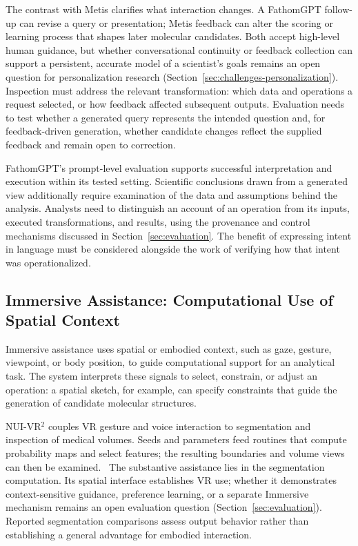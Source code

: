 The contrast with Metis clarifies what interaction changes. A FathomGPT follow-up can revise a query or presentation; Metis feedback can alter the scoring or learning process that shapes later molecular candidates. Both accept high-level human guidance, but whether conversational continuity or feedback collection can support a persistent, accurate model of a scientist's goals remains an open question for personalization research (Section~\ref{sec:challenges-personalization}). Inspection must address the relevant transformation: which data and operations a request selected, or how feedback affected subsequent outputs. Evaluation needs to test whether a generated query represents the intended question and, for feedback-driven generation, whether candidate changes reflect the supplied feedback and remain open to correction.

FathomGPT's prompt-level evaluation supports successful interpretation and execution within its tested setting. Scientific conclusions drawn from a generated view additionally require examination of the data and assumptions behind the analysis. Analysts need to distinguish an account of an operation from its inputs, executed transformations, and results, using the provenance and control mechanisms discussed in Section~\ref{sec:evaluation}. The benefit of expressing intent in language must be considered alongside the work of verifying how that intent was operationalized.

\subsection{Immersive Assistance: Computational Use of Spatial Context}
\label{sec:assistance-immersive}

Immersive assistance uses spatial or embodied context, such as gaze, gesture, viewpoint, or body position, to guide computational support for an analytical task. The system interprets these signals to select, constrain, or adjust an operation: a spatial sketch, for example, can specify constraints that guide the generation of candidate molecular structures.

NUI-VR$^2$ couples VR gesture and voice interaction to segmentation and inspection of medical volumes. Seeds and parameters feed routines that compute probability maps and select features; the resulting boundaries and volume views can then be examined.~\cite{AnchorNUIVR} The substantive assistance lies in the segmentation computation. Its spatial interface establishes VR use; whether it demonstrates context-sensitive guidance, preference learning, or a separate Immersive mechanism remains an open evaluation question (Section~\ref{sec:evaluation}). Reported segmentation comparisons assess output behavior rather than establishing a general advantage for embodied interaction.

